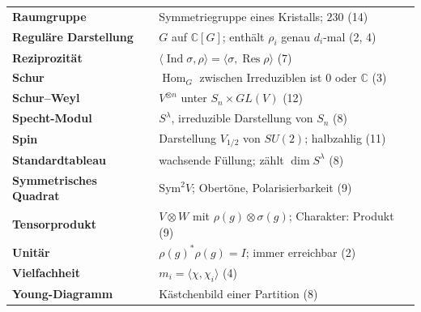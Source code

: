 \begin{merksatz}
\begin{center}
{\begin{tabular}{@{}P{3.4cm}P{5.2cm}@{}}
\toprule
\textbf{Raumgruppe} & Symmetriegruppe eines Kristalls; $230$ (14)\\
\textbf{Reguläre Darstellung} & $G$ auf $\mathbb C[G]$; enthält $\rho_i$ genau $d_i$-mal (2, 4)\\
\textbf{Reziprozität} & $\langle\operatorname{Ind}\sigma, \rho\rangle = \langle\sigma, \operatorname{Res}\rho\rangle$ (7)\\
\textbf{Schur} & $\operatorname{Hom}_G$ zwischen Irreduziblen ist $0$ oder $\mathbb C$ (3)\\
\textbf{Schur--Weyl} & $V^{\otimes n}$ unter $S_n\times GL(V)$ (12)\\
\textbf{Specht-Modul} & $S^{\lambda}$, irreduzible Darstellung von $S_n$ (8)\\
\textbf{Spin} & Darstellung $V_{1/2}$ von $SU(2)$; halbzahlig (11)\\
\textbf{Standardtableau} & wachsende Füllung; zählt $\dim S^{\lambda}$ (8)\\
\textbf{Symmetrisches Qua\-drat} & $\mathrm{Sym}^{2}V$; Obertöne, Polarisierbarkeit (9)\\
\textbf{Tensorprodukt} & $V\otimes W$ mit $\rho(g)\otimes\sigma(g)$; Charakter: Produkt (9)\\
\textbf{Unitär} & $\rho(g)^{*}\rho(g) = I$; immer erreichbar (2)\\
\textbf{Vielfachheit} & $m_i = \langle\chi, \chi_i\rangle$ (4)\\
\textbf{Young-Diagramm} & Kästchenbild einer Partition (8)\\
\bottomrule
\end{tabular}}
\end{center}
\end{merksatz}
